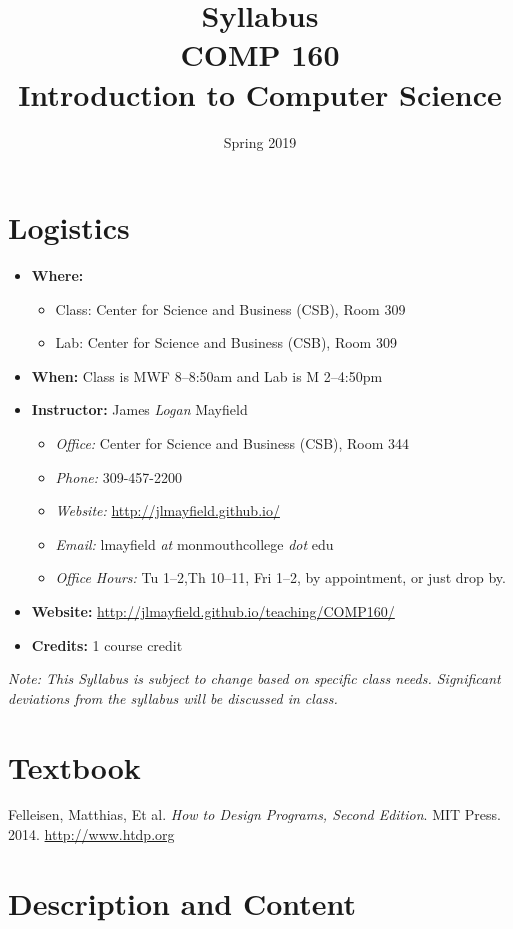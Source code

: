 \documentclass[10pt]{article}
\title{Syllabus \\ COMP 160 \\ Introduction to Computer Science}
\author{  }
\date{Spring 2019}
\begin{document}
\maketitle

\section{Logistics}
\begin{itemize}
\item \textbf{Where: }
\begin{itemize}
\item Class: Center for Science and Business (CSB), Room 309
\item Lab: Center for Science and Business (CSB), Room 309
\end{itemize}
\item \textbf{When: } Class is MWF 8--8:50am and Lab is M 2--4:50pm
\item \textbf{Instructor: } James \textit{Logan} Mayfield
\begin{itemize}
\item \textit{Office: } Center for Science and Business (CSB), Room 344
\item \textit{Phone: } 309-457-2200 %
\item \textit{Website: } \url{http://jlmayfield.github.io/}
\item \textit{Email: } lmayfield \textit{at} monmouthcollege \textit{dot} edu
\item \textit{Office Hours: } Tu 1--2,Th 10--11, Fri 1--2, by appointment, or just drop by.
\end{itemize}
\item \textbf{Website: } \url{http://jlmayfield.github.io/teaching/COMP160/}
\item \textbf{Credits: } 1 course credit
\end{itemize}
\emph{Note: This Syllabus is subject to change based on specific class needs. Significant deviations from the syllabus will be discussed in class.}

\section{Textbook}

\noindent
Felleisen, Matthias, Et al\@. \textit{How to Design Programs, Second Edition}. MIT Press. 2014. \url{http://www.htdp.org} %

\section{Description and Content}
\end{document}
